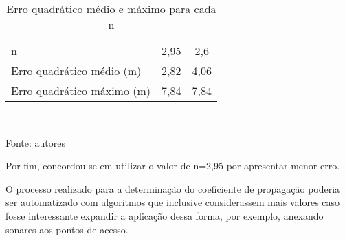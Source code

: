 \begin{table}[ht]
\centering
\caption{Erro quadrático médio e máximo para cada n}
\vspace{0.5cm}
\begin{tabular}{l|cc}
\hline
n & 2,95 & 2,6 \vspace{0.4cm}\\
Erro quadrático médio (m) & 2,82 & 4,06 \vspace{0.4cm}\\
Erro quadrático máximo (m) & 7,84 & 7,84
\end{tabular}
\vspace{0.4cm}\\
\centerline{\small{Fonte: autores}}
\end{table}

Por fim, concordou-se em utilizar o valor de n=2,95 por apresentar menor erro.

O processo realizado para a determinação do coeficiente de propagação poderia ser automatizado com algoritmos que inclusive considerassem mais valores caso fosse interessante expandir a aplicação dessa forma, por exemplo, anexando sonares aos pontos de acesso.
